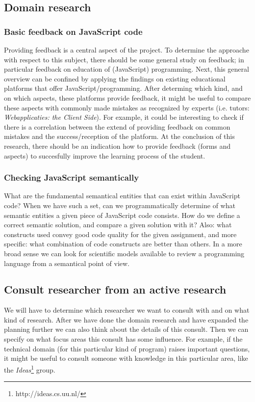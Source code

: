 \documentclass{article}
\begin{document}
\subsection{Domain research}

\subsubsection{Basic feedback on JavaScript code}
Providing feedback is a central aspect of the project. To determine the
approache with respect to this subject, there should be some general study on
feedback; in particular feedback on education of (JavaScript)
programming. Next, this general overview can be confined by applying the
findings on existing educational platforms that offer
JavaScript/programming. After determing which kind, and on which aspects, these
platforms provide feedback, it might be useful to compare these aspects with
commonly made mistakes as recognized by experts (i.e. tutors: {\em
Webapplicaties: the Client Side}). For example, it could be interesting to
check if there is a correlation between the extend of providing feedback on
common mistakes and the success/reception of the platform. At the conclusion of
this research, there should be an indication how to provide feedback (forms and
aspects) to succesfully improve the learning process of the student.

\subsubsection{Checking JavaScript semantically}
What are the fundamental semantical entities that can exist within JavaScript
code? When we have such a set, can we programmatically determine of what
semantic entities a given piece of JavaScript code consists. How do we define a
correct semantic solution, and compare a given solution with it? Also: what
constructs used convey good code quality for the given assignment, and more
specific: what combination of code constructs are better than others. In a
more broad sense we can look for scientific models available to review a
programming language from a semantical point of view. 

\subsection{Consult researcher from an active research}
We will have to determine which researcher we want to consult with and on what
kind of research. After we have done the domain research and have expanded the
planning further we can also think about the details of this consult. Then we
can specify on what focus areas this consult has some influence. For example,
if the technical domain (for this particular kind of program) raises important
questions, it might be useful to consult someone with knowledge in this
particular area, like the {\em Ideas}\footnote{http://ideas.cs.uu.nl/} group.
\end{document}
